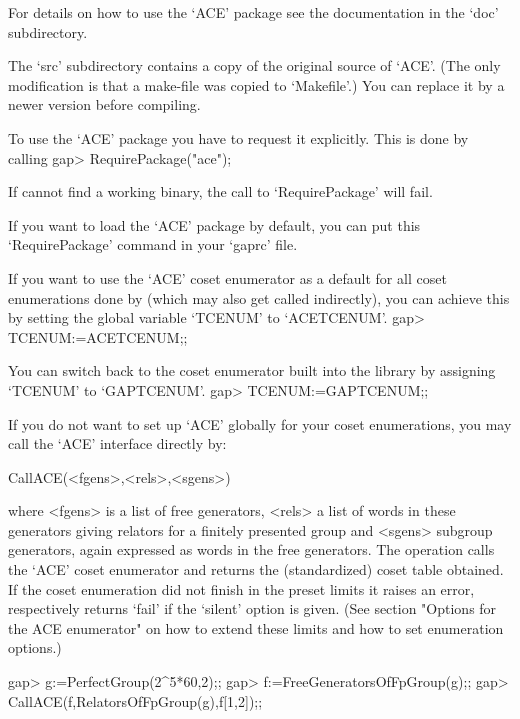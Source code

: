 For details on how to use the `ACE' package see the documentation in the
`doc' subdirectory.

The `src' subdirectory contains a copy of the original source of `ACE'. (The
only modification is that a make-file was copied to `Makefile'.) You can
replace it by a newer version before compiling.


To use the `ACE' package you have to request it explicitly. This is done by
calling 
\begintt
gap> RequirePackage("ace");
\endtt

If {\GAP} cannot find a working binary, the call to `RequirePackage' will
fail.

If you want to load the `ACE' package by default, you can put this
`RequirePackage' command in your `gaprc' file.

If you want to use the `ACE' coset enumerator as a default for all coset
enumerations done by {\GAP} (which may also get called indirectly), you can 
achieve this by setting the global variable `TCENUM' to `ACETCENUM'.
\begintt
gap> TCENUM:=ACETCENUM;;
\endtt

You
can switch back to the coset enumerator built into the {\GAP} library by
assigning `TCENUM' to `GAPTCENUM'.
\begintt
gap> TCENUM:=GAPTCENUM;;
\endtt



If you do not want to set up `ACE' globally for your coset enumerations,
you may call the `ACE' interface directly by:

\>CallACE(<fgens>,<rels>,<sgens>)

where <fgens> is a list of free generators, <rels> a list of words in these
generators giving relators for a finitely presented group and <sgens>
subgroup generators, again expressed as words in the free generators. The
operation calls the `ACE' coset enumerator and returns the (standardized)
coset table obtained. If the coset enumeration did not finish in the preset
limits it raises an error, respectively returns `fail' if the `silent'
option is given.
(See section "Options for the ACE enumerator" on how to extend these
limits and how to set enumeration options.)

\begintt
gap> g:=PerfectGroup(2^5*60,2);;
gap> f:=FreeGeneratorsOfFpGroup(g);;
gap> CallACE(f,RelatorsOfFpGroup(g),f{[1,2]});;
\endtt

